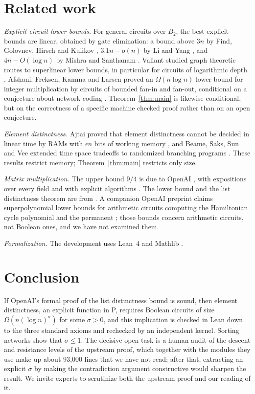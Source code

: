 \documentclass[11pt]{amsart}
\theoremstyle{definition}
\theoremstyle{remark}
\begin{document}
\section{Related work}\label{sec:related}
\emph{Explicit circuit lower bounds.} For general circuits over $B_2$, the best explicit bounds are linear, obtained by gate elimination: a bound above $3n$ by Find, Golovnev, Hirsch and Kulikov \cite{FGHK16}, $3.1n-o(n)$ by Li and Yang \cite{LiYang22}, and $4n-O(\log n)$ by Mishra and Santhanam \cite{MishraSanthanam26}. Valiant studied graph theoretic routes to superlinear lower bounds, in particular for circuits of logarithmic depth \cite{Valiant77}. Afshani, Freksen, Kamma and Larsen proved an $\Omega(n\log n)$ lower bound for integer multiplication by circuits of bounded fan-in and fan-out, conditional on a conjecture about network coding \cite{AFKL19}. Theorem~\ref{thm:main} is likewise conditional, but on the correctness of a specific machine checked proof rather than on an open conjecture.

\emph{Element distinctness.} Ajtai proved that element distinctness cannot be decided in linear time by RAMs with $\epsilon n$ bits of working memory \cite{Ajtai02}, and Beame, Saks, Sun and Vee extended time space tradeoffs to randomized branching programs \cite{BSSV03}. These results restrict memory; Theorem~\ref{thm:main} restricts only size.

\emph{Matrix multiplication.} The upper bound $9/4$ is due to OpenAI \cite{OAIupper}, with expositions over every field \cite{AvdBZ} and with explicit algorithms \cite{Shpilka26}. The lower bound and the list distinctness theorem are from \cite{OAI94}. A companion OpenAI preprint claims superpolynomial lower bounds for arithmetic circuits computing the Hamiltonian cycle polynomial and the permanent \cite{OAIham}; those bounds concern arithmetic circuits, not Boolean ones, and we have not examined them.

\emph{Formalization.} The development uses Lean~4 \cite{Lean4} and Mathlib \cite{Mathlib20}.

\section{Conclusion}
If OpenAI's formal proof of the list distinctness bound is sound, then element distinctness, an explicit function in P, requires Boolean circuits of size $\Omega(n(\log n)^{\sigma})$ for some $\sigma>0$, and this implication is checked in Lean down to the three standard axioms and rechecked by an independent kernel. Sorting networks show that $\sigma\le 1$. The decisive open task is a human audit of the descent and resistance levels of the upstream proof, which together with the modules they use make up about 93,000 lines that we have not read; after that, extracting an explicit $\sigma$ by making the contradiction argument constructive would sharpen the result. We invite experts to scrutinize both the upstream proof and our reading of it.
\end{document}
